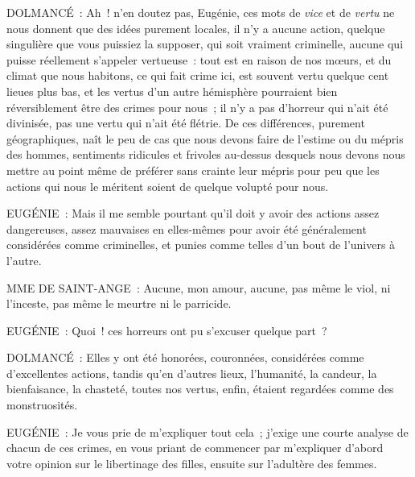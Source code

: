 \documentclass[french,twoside]{book} %
\begin{document}
DOLMANCÉ : Ah ! n’en doutez pas, Eugénie, ces mots de {\itshape vice} et de {\itshape vertu} ne nous donnent que des idées purement locales, il n’y a aucune action, quelque singulière que vous puissiez la supposer, qui soit vraiment criminelle, aucune qui puisse réellement s’appeler vertueuse : tout est en raison de nos mœurs, et du climat que nous habitons, ce qui fait crime ici, est souvent vertu quelque cent lieues plus bas, et les vertus d’un autre hémisphère pourraient bien réversiblement être des crimes pour nous ; il n’y a pas d’horreur qui n’ait été divinisée, pas une vertu qui n’ait été flétrie. De ces différences, purement géographiques, naît le peu de cas que nous devons faire de l’estime ou du mépris des hommes, sentiments ridicules et frivoles au-dessus desquels nous devons nous mettre au point même de préférer sans crainte leur mépris pour peu que les actions qui nous le méritent soient de quelque volupté pour nous.\par
EUGÉNIE : Mais il me semble pourtant qu’il doit y avoir des actions assez dangereuses, assez mauvaises en elles-mêmes pour avoir été généralement considérées comme criminelles, et punies comme telles d’un bout de l’univers à l’autre.\par
MME DE SAINT-ANGE : Aucune, mon amour, aucune, pas même le viol, ni l’inceste, pas même le meurtre ni le parricide.\par
EUGÉNIE : Quoi ! ces horreurs ont pu s’excuser quelque part ?\par
DOLMANCÉ : Elles y ont été honorées, couronnées, considérées comme d’excellentes actions, tandis qu’en d’autres lieux, l’humanité, la candeur, la bienfaisance, la chasteté, toutes nos vertus, enfin, étaient regardées comme des monstruosités.\par
EUGÉNIE : Je vous prie de m’expliquer tout cela ; j’exige une courte analyse de chacun de ces crimes, en vous priant de commencer par m’expliquer d’abord votre opinion sur le libertinage des filles, ensuite sur l’adultère des femmes.\par
\end{document}
